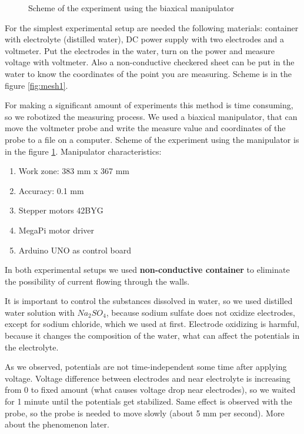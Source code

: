 \documentclass{article}
\begin{document}
\begin{figure}[h]
\begin{center}
\begin{minipage}[h]{0.47\linewidth}
\caption{Scheme of the experiment using the biaxical manipulator}
\label{fig:mesh2}
\end{minipage}
\end{center}
\end{figure}

For the simplest experimental setup are needed the following materials: container with electrolyte (distilled water), DC power supply with two electrodes and a voltmeter. Put the electrodes in the water, turn on the power and measure voltage with voltmeter. Also a non-conductive checkered sheet can be put in the water to know the coordinates of the point you are measuring. Scheme is in the figure \ref{fig:mesh1}.  \par

For making a significant amount of experiments this method is time consuming, so we robotized the measuring process. We used a biaxical manipulator, that can move the voltmeter probe and write the measure value and coordinates of the probe to a file on a computer. Scheme of the experiment using the manipulator is in the figure \ref{fig:mesh2}. Manipulator characteristics:
\begin{enumerate}
\item Work zone: 383 mm x 367 mm
\item Accuracy: 0.1 mm
\item Stepper motors 42BYG
\item MegaPi motor driver
\item Arduino UNO as control board
\end{enumerate}

In both experimental setups we used \textbf{non-conductive container} to eliminate the possibility of current flowing through the walls.\par

It is important to control the substances dissolved in water, so we used distilled water solution with $Na_2SO_4$, because sodium sulfate does not oxidize electrodes, except for sodium chloride, which we used at first. Electrode oxidizing is harmful, because it changes the composition of the water, what can affect the potentials in the electrolyte.\par

As we observed, potentials are not time-independent some time after applying voltage. Voltage difference between electrodes and near electrolyte is increasing from 0 to fixed amount (what causes voltage drop near electrodes), so we waited for 1 minute until the potentials get stabilized. Same effect is observed with the probe, so the probe is needed to move slowly (about 5 mm per second). More about the phenomenon later. \par
\end{document}
